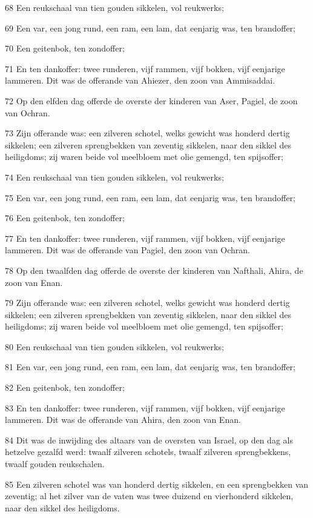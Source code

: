 \par 68 Een reukschaal van tien gouden sikkelen, vol reukwerks;
\par 69 Een var, een jong rund, een ram, een lam, dat eenjarig was, ten brandoffer;
\par 70 Een geitenbok, ten zondoffer;
\par 71 En ten dankoffer: twee runderen, vijf rammen, vijf bokken, vijf eenjarige lammeren. Dit was de offerande van Ahiezer, den zoon van Ammisaddai.
\par 72 Op den elfden dag offerde de overste der kinderen van Aser, Pagiel, de zoon van Ochran.
\par 73 Zijn offerande was: een zilveren schotel, welks gewicht was honderd dertig sikkelen; een zilveren sprengbekken van zeventig sikkelen, naar den sikkel des heiligdoms; zij waren beide vol meelbloem met olie gemengd, ten spijsoffer;
\par 74 Een reukschaal van tien gouden sikkelen, vol reukwerks;
\par 75 Een var, een jong rund, een ram, een lam, dat eenjarig was, ten brandoffer;
\par 76 Een geitenbok, ten zondoffer;
\par 77 En ten dankoffer: twee runderen, vijf rammen, vijf bokken, vijf eenjarige lammeren. Dit was de offerande van Pagiel, den zoon van Ochran.
\par 78 Op den twaalfden dag offerde de overste der kinderen van Nafthali, Ahira, de zoon van Enan.
\par 79 Zijn offerande was: een zilveren schotel, welks gewicht was honderd dertig sikkelen; een zilveren sprengbekken van zeventig sikkelen, naar den sikkel des heiligdoms; zij waren beide vol meelbloem met olie gemengd, ten spijsoffer;
\par 80 Een reukschaal van tien gouden sikkelen, vol reukwerks;
\par 81 Een var, een jong rund, een ram, een lam, dat eenjarig was, ten brandoffer;
\par 82 Een geitenbok, ten zondoffer;
\par 83 En ten dankoffer: twee runderen, vijf rammen, vijf bokken, vijf eenjarige lammeren. Dit was de offerande van Ahira, den zoon van Enan.
\par 84 Dit was de inwijding des altaars van de oversten van Israel, op den dag als hetzelve gezalfd werd: twaalf zilveren schotels, twaalf zilveren sprengbekkens, twaalf gouden reukschalen.
\par 85 Een zilveren schotel was van honderd dertig sikkelen, en een sprengbekken van zeventig; al het zilver van de vaten was twee duizend en vierhonderd sikkelen, naar den sikkel des heiligdoms.
